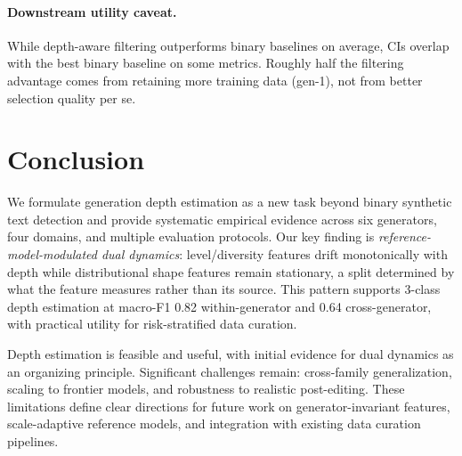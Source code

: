 \documentclass[letterpaper]{article}
\begin{document}
\paragraph{Downstream utility caveat.}
While depth-aware filtering outperforms binary baselines on average, CIs overlap with the best binary baseline on some metrics.
Roughly half the filtering advantage comes from retaining more training data (gen-1), not from better selection quality per se.

\section{Conclusion}
\label{sec:conclusion}

We formulate generation depth estimation as a new task beyond binary synthetic text detection and provide systematic empirical evidence across six generators, four domains, and multiple evaluation protocols.
Our key finding is \emph{reference-model-modulated dual dynamics}: level/diversity features drift monotonically with depth while distributional shape features remain stationary, a split determined by what the feature measures rather than its source.
This pattern supports 3-class depth estimation at macro-F1 0.82 within-generator and 0.64 cross-generator, with practical utility for risk-stratified data curation.

Depth estimation is feasible and useful, with initial evidence for dual dynamics as an organizing principle.
Significant challenges remain: cross-family generalization, scaling to frontier models, and robustness to realistic post-editing.
These limitations define clear directions for future work on generator-invariant features, scale-adaptive reference models, and integration with existing data curation pipelines.
\end{document}

